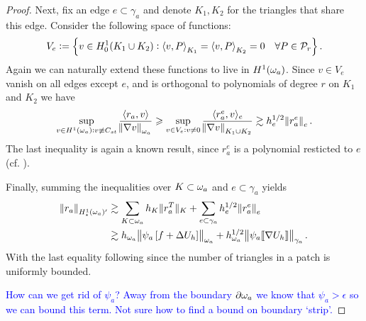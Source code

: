 \documentclass[thesis.tex]{subfiles}
\begin{document}
\begin{proof}
  Next, fix an edge $e \subset \gamma_a$ and denote $K_1, K_2$ for the triangles that share this edge. Consider the following space of functions:
  \[
  V_e := \set{v \in H_0^1(K_1 \cup K_2) : \left \langle v,P \right \rangle_{K_1}= \left \langle v,P \right \rangle_{K_2} = 0\quad \forall P \in \mathcal{P}_r}.\]
  Again we can naturally extend these functions to live in $H^1(\omega_a)$. Since $v \in V_e$ vanish on all edges except $e$, and
  is orthogonal to polynomials of degree $r$ on $K_1$ and $K_2$ we have
  \[
         \sup_{v \in H^1(\omega_a) : v \not \equiv C_{st}} { \left \langle r_a, v \right \rangle \over \norm{\nabla v}_{\omega_a}} 
         \geqslant \sup_{v \in V_e: v \ne 0} { \langle r^e_a, v \rangle_e \over \norm{\nabla v}_{K_1 \cup K_2}}
         \gtrsim h_e^{1/2} \norm{r^e_a}_e.
  \]
  The last inequality is again a known result, since $r^e_a$ is a polynomial resticted to $e$ (cf. \cite[Ex~9.x.7]{brenner}).

  Finally, summing the inequalities over $K \subset \omega_a$ and $e \subset \gamma_a$ yields
  \begin{align*}
    \norm{r_a}_{H_\star^1(\omega_a)'} &\gtrsim \sum_{K \subset \omega_a} h_K \|{r^T_a}\|_K + \sum_{e \subset \gamma_a} h_e^{1/2} \norm{r^e_a}_e\\
    &\gtrsim h_{\omega_a} \norm{\psi_a \left[ f + \Delta U_h \right]}_{\omega_a} + h_{\omega_a}^{1/2} \norm{ \psi_a \llbracket \nabla U_h \rrbracket}_{\gamma_a}.
  \end{align*}
  With the last equality following since the number of triangles in a patch is uniformly bounded.

  \textcolor{blue}{How can we get rid of $\psi_a$? Away from the boundary $\partial \omega_a$ we know that $\psi_a > \epsilon$ so we can bound this term. Not sure how to find a bound on boundary `strip'.}



\end{proof}
\end{document}
